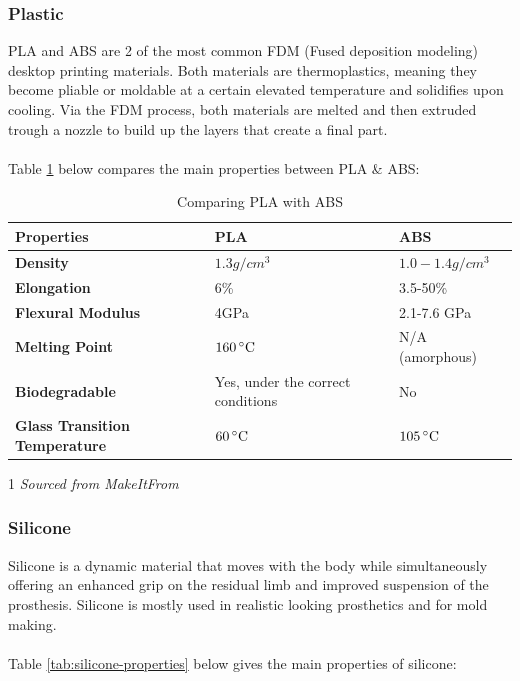 \documentclass[11pt, a4paper]{article}
\begin{document}
\subsubsection{Plastic}
PLA and ABS are 2 of the most common FDM (Fused deposition modeling) desktop printing materials.
Both materials are thermoplastics, meaning they become pliable or moldable at a certain elevated temperature and solidifies upon cooling.
Via the FDM process, both materials are melted and then extruded trough a nozzle to build up the layers that create a final part.
\\ \\
Table \ref{tab:pla-abs} below compares the main properties between PLA \& ABS:

\begin{table}[ht]
    \centering
    \begin{threeparttable}
        \begin{tabular}[t]{>{\bfseries}l l l}
            \toprule
            Properties\tnote{1} & \textbf{PLA} & \textbf{ABS} \\
            \midrule
            Density & $1.3 g/cm^3$ & $1.0 - 1.4 g/cm^3$ \\
            Elongation & 6\% & 3.5-50\% \\ %
            Flexural Modulus & 4GPa & 2.1-7.6 GPa \\ %
            Melting Point & $160\,^{\circ}{\rm C}$ & N/A (amorphous) \\
            Biodegradable & Yes, under the correct conditions & No \\
            Glass Transition Temperature & $60\,^{\circ}{\rm C}$ & $105\,^{\circ}{\rm C}$ \\ %
            \bottomrule
        \end{tabular}
        \caption{Comparing PLA with ABS}
        \label{tab:pla-abs}
        \begin{tablenotes}
            \item[1] \textit{Sourced from MakeItFrom \cite{MakeItFrom}}
        \end{tablenotes}    
    \end{threeparttable}    
\end{table}

\subsubsection{Silicone}
Silicone is a dynamic material that moves with the body while simultaneously offering 
an enhanced grip on the residual limb and improved suspension of the prosthesis.
Silicone is mostly used in realistic looking prosthetics and for mold making.
\\ \\ 
Table \ref{tab:silicone-properties} below gives the main properties of silicone:
\end{document}
